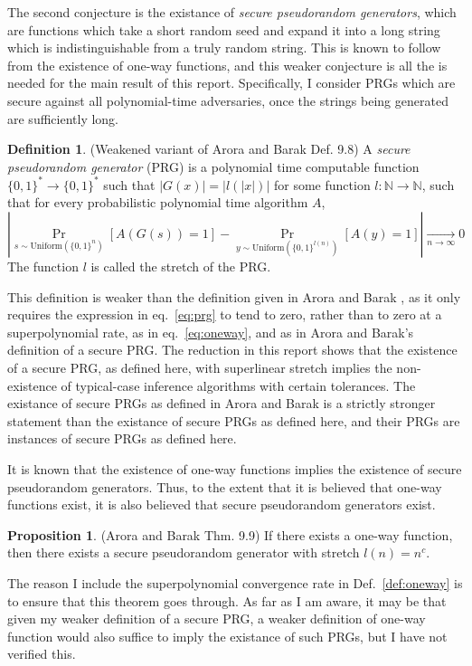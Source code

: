 \documentclass{article}
\theoremstyle{definition}
\newtheorem{defn}{Definition}
\newtheorem{prop}[thm]{Proposition}
\theoremstyle{remark}
\begin{document}
The second conjecture is the existance of \textit{secure pseudorandom generators}, which are functions which take a short random seed and expand it into a long string which is indistinguishable from a truly random string.
This is known to follow from the existence of one-way functions, and this weaker conjecture is all the is needed for the main result of this report.
Specifically, I consider PRGs which are secure against all polynomial-time adversaries, once the strings being generated are sufficiently long.

\begin{defn}{(Weakened variant of Arora and Barak Def. 9.8)}
A \textit{secure pseudorandom generator} (PRG) is a polynomial time computable function $\{0, 1\}^* \to \{0, 1\}^*$ such that $|G(x)| = |l(|x|)|$ for some function $l : \mathbb{N} \to \mathbb{N}$, such that for every probabilistic polynomial time algorithm $A$,
\begin{equation} \label{eq:prg}
|\Pr_{s \sim \text{Uniform}(\{0, 1\}^n)}[A(G(s)) = 1] - \Pr_{y \sim \text{Uniform}(\{0, 1\}^{l(n)})}[A(y) = 1]| \underset{n \to \infty}{\to} 0
\end{equation}
The function $l$ is called the stretch of the PRG.
\end{defn}
This definition is weaker than the definition given in Arora and Barak \cite{arora2009computational}, as it only requires the expression in eq.~\ref{eq:prg} to tend to zero, rather than to zero at a superpolynomial rate, as in eq.~\ref{eq:oneway}, and as in Arora and Barak's definition of a secure PRG.
The reduction in this report shows that the existence of a secure PRG, as defined here, with superlinear stretch implies the non-existence of typical-case inference algorithms with certain tolerances.
The existance of secure PRGs as defined in Arora and Barak is a strictly stronger statement than the existance of secure PRGs as defined here, and their PRGs are instances of secure PRGs as defined here.

It is known that the existence of one-way functions implies the existence of secure pseudorandom generators.
Thus, to the extent that it is believed that one-way functions exist, it is also believed that secure pseudorandom generators exist.
\begin{prop}{(Arora and Barak Thm. 9.9)} \label{prop:oneway_to_prg}
If there exists a one-way function, then there exists a secure pseudorandom generator with stretch $l(n) = n^c$.
\end{prop}
The reason I include the superpolynomial convergence rate in Def.~\ref{def:oneway} is to ensure that this theorem goes through.
As far as I am aware, it may be that given my weaker definition of a secure PRG, a weaker definition of one-way function would also suffice to imply the existance of such PRGs, but I have not verified this.
\end{document}
